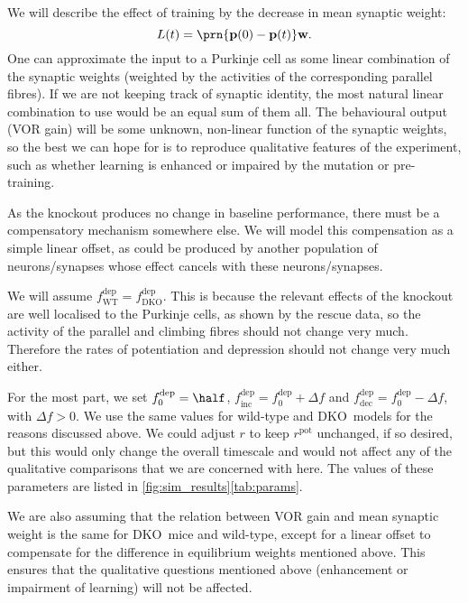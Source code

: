 \documentclass[10pt]{article}
\newcommand{\pr}{\mathbf{p}}
\newcommand{\w}{\mathbf{w}}
\newcommand{\pot}{^{\text{pot}}}
\newcommand{\dep}{^{\text{dep}}}
\newcommand{\norm}{_0}
\newcommand{\inc}{_{\text{inc}}}
\newcommand{\dec}{_{\text{dec}}}
\newcommand{\wt}{_{\text{WT}}}
\newcommand{\ko}{_{\text{\KO}}}
\newcommand{\KO}{DKO}
\begin{document}
We will describe the effect of training by the decrease in mean synaptic weight:
%
\begin{equation}\label{eq:learning}
  L(t) = \prn{\pr(0)-\pr(t)}\w.
\end{equation}
%
One can approximate the input to a Purkinje cell as some linear combination of the synaptic weights (weighted by the activities of the corresponding parallel fibres).
If we are not keeping track of synaptic identity, the most natural linear combination to use would be an equal sum of them all.
The behavioural output (VOR gain) will be some unknown, non-linear function of the synaptic weights, so the best we can hope for is to reproduce qualitative features of the experiment, such as whether learning is enhanced or impaired by the mutation or pre-training.

As the knockout produces no change in baseline performance, there must be a compensatory mechanism somewhere else.
We will model this compensation as a simple linear offset, as could be produced by another population of neurons/synapses whose effect cancels with these neurons/synapses.

We will assume $f\dep\wt=f\dep\ko$.
This is because the relevant effects of the knockout are well localised to the Purkinje cells, as shown by the rescue data, so the activity of the parallel and climbing fibres should not change very much.
Therefore the rates of potentiation and depression should not change very much either.

For the most part, we set $f\dep\norm=\half$, $f\dep\inc=f\dep\norm+\Delta f$ and $f\dep\dec=f\dep\norm-\Delta f$, with $\Delta f>0$.
We use the same values for wild-type and \KO\ models for the reasons discussed above.
We could adjust $r$ to keep $r\pot$ unchanged, if so desired, but this would only change the overall timescale and would not affect any of the qualitative comparisons that we are concerned with here.
The values of these parameters are listed in \autoref{fig:sim_results}\ref{tab:params}.

We are also assuming that the relation between VOR gain and mean synaptic weight is the same for \KO\ mice and wild-type, except for a linear offset to compensate for the difference in equilibrium weights mentioned above.
This ensures that the qualitative questions mentioned above (enhancement or impairment of learning) will not be affected.
\end{document}

